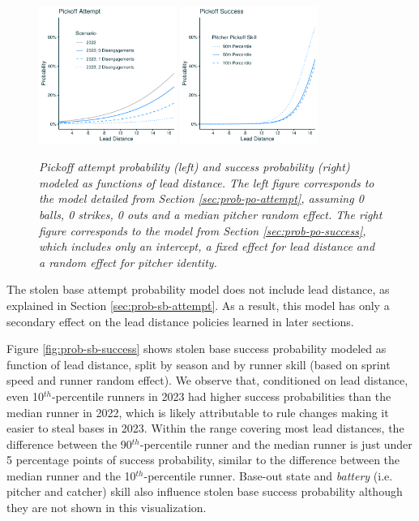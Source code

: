 \documentclass{article}
\begin{document}
      \begin{figure}[H]
        \centering
        \includegraphics[width = 0.4\textwidth]{prob_po_attempt_light.pdf}
        \includegraphics[width = 0.4\textwidth]{prob_po_success_light.pdf}
        \caption{
          \it Pickoff attempt probability (left) and success probability (right) modeled as functions of lead distance. The left figure corresponds to the model detailed from Section \ref{sec:prob-po-attempt}, assuming 0 balls, 0 strikes, 0 outs and a median pitcher random effect. The right figure corresponds to the model from Section \ref{sec:prob-po-success}, which includes only an intercept, a fixed effect for lead distance and a random effect for pitcher identity.
        }
        \label{fig:prob-pickoff}
      \end{figure}

      The stolen base attempt probability model does not include lead distance, as explained in Section \ref{sec:prob-sb-attempt}. As a result, this model has only a secondary effect on the lead distance policies learned in later sections.

      Figure \ref{fig:prob-sb-success} shows stolen base success probability modeled as function of lead distance, split by season and by runner skill (based on sprint speed and runner random effect). We observe that, conditioned on lead distance, even 10$^{th}$-percentile runners in 2023 had higher success probabilities than the median runner in 2022, which is likely attributable to rule changes making it easier to steal bases in 2023. Within the range covering most lead distances, the difference between the 90$^{th}$-percentile runner and the median runner is just under 5 percentage points of success probability, similar to the difference between the median runner and the 10$^{th}$-percentile runner. Base-out state and {\it battery} (i.e. pitcher and catcher) skill also influence stolen base success probability although they are not shown in this visualization.
      
\end{document}
